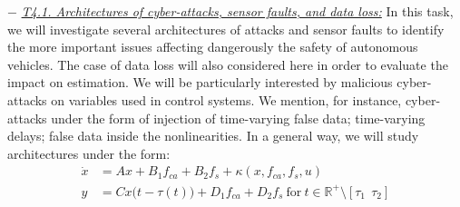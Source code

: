 \documentclass[a4paper,11pt]{article}
\begin{document}
\begin{itemize}[leftmargin=.2in,noitemsep,nolistsep]
\begin{tcolorbox}[breakable, enhanced,  colback=blue!2!white,
title = \bf Contributors$-$Deadlines$-$Objectives, coltitle= black, colbacktitle=green!40!white, halign title=center]
\end{tcolorbox}

%
\subitem$-$ \underline{\it T4.1. Architectures of cyber-attacks, sensor faults, and data loss:} In this task, we will investigate several architectures of attacks and sensor faults to identify the more important issues affecting dangerously the safety of autonomous vehicles. The case of data loss will also considered here in order to evaluate the impact on estimation. We will be particularly interested by malicious cyber-attacks on variables used in control systems. We mention, for instance, cyber-attacks under the form of injection of time-varying false data; time-varying delays; false data inside the nonlinearities. In a general way, we will study architectures under the form:
\begin{subequations}\label{UIO}
\begin{align}\label{UIO.1}
\dot x & = A x + B_1 f_{ca} + B_2 f_{s} + \kappa(x, f_{ca}, f_s, u)\\
y & = Cx\big(t-\tau(t)\big) + D_1 f_{ca} + D_2 f_{s}~\text{for}~t\in \mathbb{R}^{+}\setminus [\tau_1~~\tau_2]
\end{align}

\end{subequations}
\end{itemize}
\end{document}
